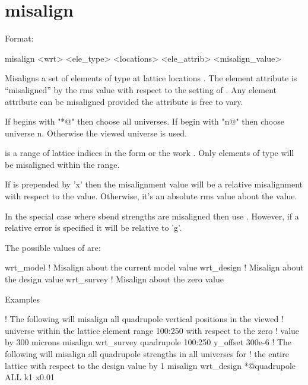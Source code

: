 {{{\section{misalign}
\label{s:misalign}

Format:
\begin{example}
   misalign <wrt> <ele_type> <locations> <ele_attrib> <misalign_value>
\end{example}

\vskip 0.2in
Misaligns a set of elements of type  at lattice
locations .  The element attribute 
is ``misaligned'' by the rms value  with respect
to the setting of . Any element attribute can be misaligned
provided the attribute is free to vary.

If  begins with "*@" then choose all universes. If
 begin with "n@" then choose universe n. Otherwise the
viewed universe is used.

 is a range of lattice indices in the form
 or the work . Only elements of type
 will be misaligned within the range.

If  is prepended by 'x' then the misalignment value will be
a relative misalignment with respect to the  value. Otherwise, it's an 
absolute rms value about the  value.

In the special case where sbend strengths are misaligned then use
. However, if a relative error is specified it will be 
relative to 'g'.

The possible values of  are:
\begin{example}
  wrt_model          ! Misalign about the current model value
  wrt_design         ! Misalign about the design value
  wrt_survey         ! Misalign about the zero value
\end{example}

Examples
\begin{example}
   ! The following will misalign all quadrupole vertical positions in the viewed
   ! universe within the lattice element range 100:250 with respect to the zero 
   ! value by 300 microns
  misalign wrt_survey quadrupole 100:250 y_offset 300e-6
   ! The following will misalign all quadrupole strengths in all universes for
   ! the entire lattice with respect to the design value by 1%
  misalign wrt_design *@quadrupole ALL k1 x0.01
\end{example}

}}}
